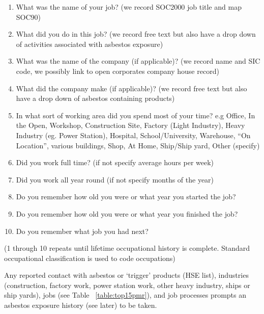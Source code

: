 \documentclass[a4paper,10pt]{article}
\begin{document}
\begin{enumerate}
\item  What was the name of your job? (we record SOC2000 job title and map SOC90)
\item  What did you do in this job? (we record free text but also have a drop down of activities associated with asbestos exposure)
\item  What was the name of the company (if applicable)? (we record name and SIC code, we possibly link to open corporates company house record)
\item  What did the company make (if applicable)? (we record free text but also have a drop down of asbestos containing products)
\item  In what sort of working area did you spend most of your time? e.g Office, In the Open, Workshop, Construction Site, Factory (Light Industry), Heavy Industry (eg. Power Station), Hospital, School/University, Warehouse, “On Location”, various buildings, Shop, At Home, Ship/Ship yard, Other (specify) 
\item  Did you work full time? (if not specify average hours per week)
\item  Did you work all year round (if not specify months of the year)
\item  Do you remember how old you were or what year you started the job?
\item  Do you remember how old you were or what year you finished the job?
\item  Do you remember what job you had next?
\end{enumerate}

(1 through 10 repeats until lifetime occupational history is complete. Standard occupational classification is used to code occupations)

Any reported contact with asbestos or `trigger' products (HSE list), industries (construction, factory work, power station work, other heavy industry, ships or ship yards), jobs (see Table ~\ref{table:top15pmr}), and job processes prompts an asbestos exposure history (see later) to be taken.
\end{document}
